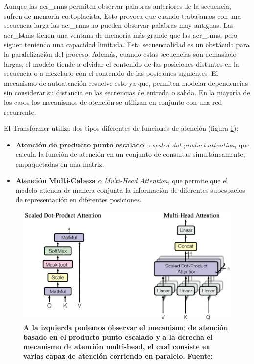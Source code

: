 Aunque las \acrshort{acr_rnn}s permiten observar palabras anteriores de la secuencia, sufren de memoria cortoplacista. Esto provoca que cuando trabajamos con una secuencia larga las \acrshort{acr_rnn}s no pueden observar palabras muy antiguas. Las \acrshort{acr_lstm}s tienen una ventana de memoria más grande que las \acrshort{acr_rnn}s, pero siguen teniendo una capacidad limitada. Esta secuencialidad es un obstáculo para la paralelización del proceso. Además, cuando estas secuencias son demasiado largas, el modelo tiende a olvidar el contenido de las posiciones distantes en la secuencia o a mezclarlo con el contenido de las posiciones siguientes. El mecanismo de autoatención resuelve esto ya que, permiten modelar dependencias sin considerar su distancia en las secuencias de entrada o salida. En la mayoría de los casos los mecanismos de atención se utilizan en conjunto con una red recurrente.

El Transformer utiliza dos tipos diferentes de funciones de atención (figura \ref{fig-intro-bert-attention}):
\begin{itemize}
    \item \textbf{Atención de producto punto escalado} o \textit{scaled dot-product attention}, que calcula la función de atención en un conjunto de consultas simultáneamente, empaquetadas en una matriz. 
    \item \textbf{Atención Multi-Cabeza} o \textit{Multi-Head Attention}, que permite que el modelo atienda de manera conjunta la información de diferentes subespacios de representación en diferentes posiciones.
\end{itemize}

\begin{figure}[ht!]
    \centering
    \includegraphics[scale=0.7]{figuras/intro-bert-attention.png}
    \caption[BERT - Mecanismos de Atención]{\textbf{A la izquierda podemos observar el mecanismo de atención basado en el producto punto escalado y a la derecha el mecanismo de atención multi-head, el cual consiste en varias capaz de atención corriendo en paralelo. Fuente: \citep{https://doi.org/10.48550/arxiv.1706.03762}}}
    \label{fig-intro-bert-attention}
\end{figure}

